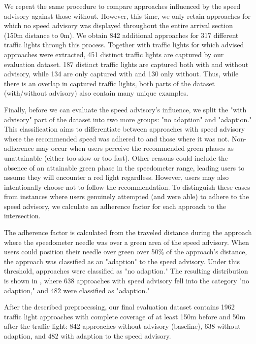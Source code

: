 We repeat the same procedure to compare approaches influenced by the speed advisory against those without. However, this time, we only retain approaches for which no speed advisory was displayed throughout the entire arrival section (150m distance to 0m). We obtain 842 additional approaches for 317 different traffic lights through this process. Together with traffic lights for which advised approaches were extracted, 451 distinct traffic lights are captured by our evaluation dataset. 187 distinct traffic lights are captured both with and without advisory, while 134 are only captured with and 130 only without. Thus, while there is an overlap in captured traffic lights, both parts of the dataset (with/without advisory) also contain many unique examples.

Finally, before we can evaluate the speed advisory's influence, we split the "with advisory" part of the dataset into two more groups: "no adaption" and "adaption." This classification aims to differentiate between approaches with speed advisory where the recommended speed was adhered to and those where it was not. Non-adherence may occur when users perceive the recommended green phases as unattainable (either too slow or too fast). Other reasons could include the absence of an attainable green phase in the speedometer range, leading users to assume they will encounter a red light regardless. However, users may also intentionally choose not to follow the recommendation. To distinguish these cases from instances where users genuinely attempted (and were able) to adhere to the speed advisory, we calculate an adherence factor for each approach to the intersection.

The adherence factor is calculated from the traveled distance during the approach where the speedometer needle was over a green area of the speed advisory. When users could position their needle over green over 50\% of the approach's distance, the approach was classified as an "adaption" to the speed advisory. Under this threshold, approaches were classified as "no adaption." The resulting distribution is shown in , where 638 approaches with speed advisory fell into the category "no adaption," and 482 were classified as "adaption."

After the described preprocessing, our final evaluation dataset contains 1962 traffic light approaches with complete coverage of at least 150m before and 50m after the traffic light: 842 approaches without advisory (baseline), 638 without adaption, and 482 with adaption to the speed advisory.

